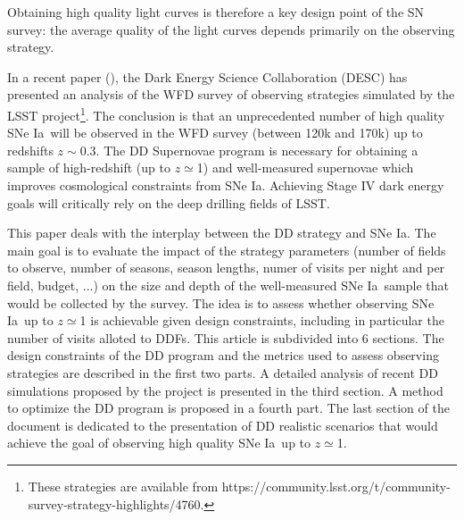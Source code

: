 \documentclass[skiphelvet,twocolumn]{lsstdescnote}
\newcommand{\sne}{{SNe Ia}}
\begin{document}
Obtaining high quality light curves is therefore a key design point of the SN survey:  the average quality of the light curves depends primarily on the observing strategy.
\par
In a recent paper (\cite{lochner2021impact}), the Dark Energy Science Collaboration (DESC) has presented an analysis of the WFD survey of observing strategies simulated by the LSST project\footnote{These strategies are available from https://community.lsst.org/t/community-survey-strategy-highlights/4760.}. The conclusion is that an unprecedented number of high quality \sne~will be observed in the WFD survey (between 120k and 170k) up to redshifts $z\sim 0.3$. The DD Supernovae program is necessary for obtaining a sample of high-redshift (up to $z\simeq$1) and well-measured supernovae which improves cosmological constraints from \sne. Achieving Stage IV dark energy goals will critically rely on the deep drilling fields of LSST.
\par
This paper deals with the interplay between the DD strategy and \sne. The main goal is to evaluate the impact of the strategy parameters (number of fields to observe, number of seasons, season lengths, numer of visits per night and per field, budget, ...) on the size and depth of the well-measured \sne~sample that would be collected by the survey. The idea is to assess whether observing \sne~up to $z\simeq$1 is achievable given design constraints, including in particular the number of visits alloted to DDFs. This article is subdivided into 6 sections. The design constraints of the DD program and the metrics used to assess observing strategies are described in the first two parts. A detailed analysis of recent DD simulations proposed by the project is presented in the third section. A method to optimize the DD program is proposed in a fourth part. The last section of the document is dedicated to the presentation of  DD realistic scenarios that would achieve the goal of observing high quality \sne~up to  $z\simeq$1.
\end{document}
